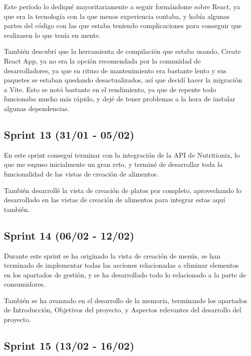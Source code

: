 Este período lo dediqué mayoritariamente a seguir formándome sobre React, ya que era la tecnología con la que menos experiencia contaba, y había algunas partes del código con las que estaba teniendo complicaciones para conseguir que realizasen lo que tenía en mente.

También descubrí que la herramienta de compilación que estaba usando, Create React App, ya no era la opción recomendada por la comunidad de desarrolladores, ya que su ritmo de mantenimiento era bastante lento y sus paquetes se estaban quedando desactualizados, así que decidí hacer la migración a Vite. Esto se notó bastante en el rendimiento, ya que de repente todo funcionaba mucho más rápido, y dejé de tener problemas a la hora de instalar algunas dependencias.


\subsection{Sprint 13 (31/01 - 05/02)}

En este sprint conseguí terminar con la integración de la API de Nutritionix, lo que me supuso inicialmente un gran reto, y terminé de desarrollar toda la funcionalidad de las vistas de creación de alimentos. 

También desarrollé la vista de creación de platos por completo, aprovechando lo desarrollado en las vistas de creación de alimentos para integrar estas aquí también.


\subsection{Sprint 14 (06/02 - 12/02)}

Durante este sprint se ha originado la vista de creación de menús, se han terminado de implementar todas las acciones relacionadas a eliminar elementos en los apartados de gestión, y se ha desarrollado todo lo relacionado a la parte de consumidores.

También se ha avanzado en el desarrollo de la memoria, terminando los apartados de Introducción, Objetivos del proyecto, y Aspectos relevantes del desarrollo del proyecto.


\subsection{Sprint 15 (13/02 - 16/02)}

